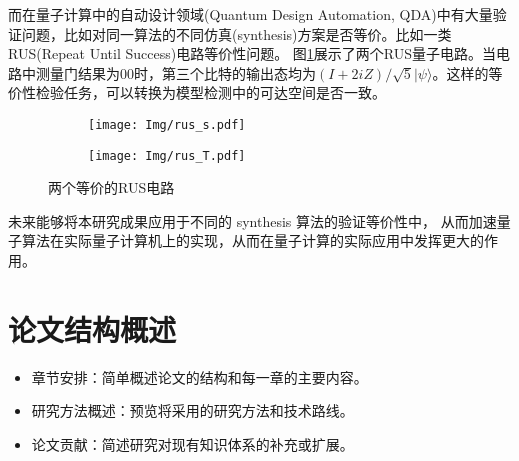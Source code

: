 而在量子计算中的自动设计领域(Quantum Design Automation, QDA)中有大量验证问题，比如对同一算法的不同仿真(synthesis)方案是否等价。比如一类RUS(Repeat Until Success)电路等价性问题。
图\ref{fig:rus-equal}展示了两个RUS量子电路。当电路中测量门结果为$00$时，第三个比特的输出态均为$\left(I+2iZ\right)/ \sqrt 5 |\psi\rangle$。这样的等价性检验任务，可以转换为模型检测中的可达空间是否一致。
\begin{figure}[!htbp]
	\centering
	\begin{subfigure}[b]{0.4\textwidth}
        \centering
        \texttt{[image: Img/rus\_s.pdf]}
	\end{subfigure}
	\qquad
	\begin{subfigure}[b]{0.4\textwidth}
        \centering
        \texttt{[image: Img/rus\_T.pdf]}
	\end{subfigure}
	\caption{两个等价的RUS电路\citep{Bocharov_2015}}
	\label{fig:rus-equal}
\end{figure}
未来能够将本研究成果应用于不同的 synthesis 算法的验证等价性中，
从而加速量子算法在实际量子计算机上的实现，从而在量子计算的实际应用中发挥更大的作用。
\section{论文结构概述}
\begin{itemize}
  \item 章节安排：简单概述论文的结构和每一章的主要内容。
  \item 研究方法概述：预览将采用的研究方法和技术路线。
  \item 论文贡献：简述研究对现有知识体系的补充或扩展。
\end{itemize}
